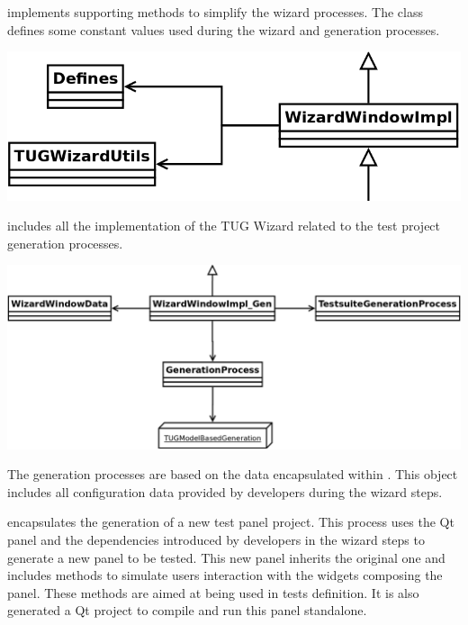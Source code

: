 implements supporting methods to simplify the wizard
processes.
%
The  class defines some constant values used during the
wizard and generation processes.


\vspace{2ex}
\begin{center}
\includegraphics[width=.65\textwidth]{images/diag/tug_wizard_classdiag_wwi1.png}
\end{center}
\vspace{2ex}



 includes all the implementation of the TUG
Wizard related to the test project generation processes. 


\vspace{2ex}
\begin{center}
\includegraphics[width=.99\textwidth]{images/diag/tug_wizard_classdiag_wwig1.png}
\end{center}
\vspace{2ex}


The generation processes are based on the data encapsulated within
. This object includes all configuration data
provided by developers during the wizard steps.


 encapsulates the generation of a new test panel
project. This process uses the Qt panel and the dependencies introduced by
developers in the wizard steps to generate a new panel to be tested.
%
This new panel inherits the original one and includes methods to simulate
users interaction with the widgets composing the panel. These methods are
aimed at being used in tests definition.
%
It is also generated a Qt project to compile and run this panel standalone.


